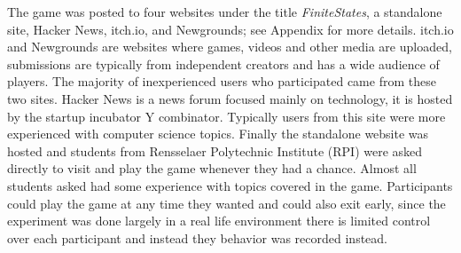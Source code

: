 \documentclass[letterpaper,man,natbib,floatsintext]{apa7}  %
\begin{document}
The game was posted to four websites under the title {\it FiniteStates}, a standalone site, Hacker News, itch.io, and Newgrounds; see Appendix for more details. itch.io and Newgrounds are websites where games, videos and other media are uploaded, submissions are typically from independent creators and has a wide audience of players. The majority of inexperienced users who participated came from these two sites. Hacker News is a news forum focused mainly on technology, 
it is hosted by the startup incubator Y combinator. Typically users from this site were more experienced with computer science topics. Finally the standalone website was hosted and students from Rensselaer Polytechnic Institute (RPI) were asked directly to visit and play 
the game whenever they had a chance. Almost all students asked had some experience with topics covered in the game. Participants could play the game at any time they wanted and could also exit early, since the experiment was done largely in a real life environment there is limited control over each participant and instead they behavior was recorded instead.
\end{document}
